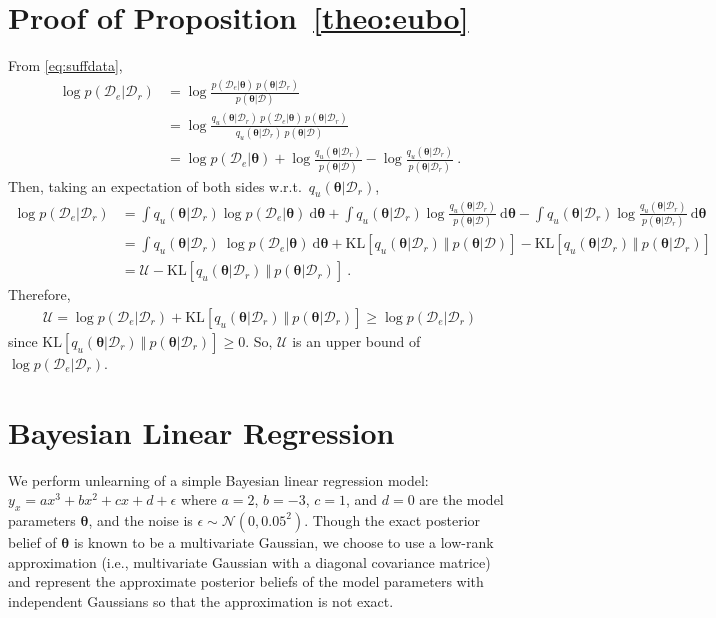 \documentclass{article}
\theoremstyle{definition}
\newcommand{\mcl}[1]{\mathcal{#1}}
\newcommand{\da}{\mcl{D}}
\newcommand{\dc}{\mcl{D}_r}
\newcommand{\dr}{\mcl{D}_e}
\begin{document}
\section{Proof of Proposition~\ref{theo:eubo}}
\label{app:eubo}
%
From \eqref{eq:suffdata}, 
%
\begin{align*}
\log p(\dr|\dc) &= \log \frac{p(\dr|\bm{\theta})\ p(\bm{\theta}|\dc)}{p(\bm{\theta}|\da)}\\
    &= \log \frac{q_u(\bm{\theta}|\dc)\ p(\dr|\bm{\theta})\  p(\bm{\theta}|\dc)}{q_u(\bm{\theta}|\dc)\  p(\bm{\theta}|\da)}\\
    &= \log p(\dr|\bm{\theta})
    + \log \frac{q_u(\bm{\theta}|\dc)}{p(\bm{\theta}|\da)}
    - \log \frac{q_u(\bm{\theta}|\dc)}{p(\bm{\theta}|\dc)}\ .
\end{align*}
%
Then, taking an expectation of both sides w.r.t.~$q_u(\bm{\theta}|\dc)$,
%
\begin{align*}
\log p(\dr|\dc) &=
    \int q_u(\bm{\theta}|\dc) \log p(\dr|\bm{\theta})\ \text{d}\bm{\theta}
    + \int q_u(\bm{\theta}|\dc) \log \frac{q_u(\bm{\theta}|\dc)}{p(\bm{\theta}|\da)}\ \text{d}\bm{\theta}
    - \int q_u(\bm{\theta}|\dc) \log \frac{q_u(\bm{\theta}|\dc)}{p(\bm{\theta}|\dc)}\ \text{d}\bm{\theta}\\
    &= \int q_u(\bm{\theta}|\dc)\  \log p(\dr|\bm{\theta})\ \text{d}\bm{\theta}
    + \text{KL}[q_u(\bm{\theta}|\dc)\ \Vert\ p(\bm{\theta}|\da)]
    - \text{KL}[q_u(\bm{\theta}|\dc)\ \Vert\ p(\bm{\theta}|\dc)]\\
    &= \mcl{U} - \text{KL}[q_u(\bm{\theta}|\dc)\ \Vert\ p(\bm{\theta}|\dc)]\ .
\end{align*}
%
Therefore,
%
\begin{align*}
\mcl{U} =  \log p(\dr|\dc) + \text{KL}[q_u(\bm{\theta}|\dc)\ \Vert\ p(\bm{\theta}|\dc)] \ge \log p(\dr|\dc)
\end{align*}
%
since $\text{KL}[q_u(\bm{\theta}|\dc)\ \Vert\ p(\bm{\theta}|\dc)] \ge 0$.
So, $\mcl{U}$ is an upper bound of $\log p(\dr|\dc)$.
%
\section{Bayesian Linear Regression}
\label{app:lr}
%
We perform unlearning of a simple Bayesian linear regression model: $y_x = ax^3 + bx^2 + cx + d + \epsilon$ where $a=2$, $b=-3$, $c=1$, and $d=0$ are the model parameters $\bm{\theta}$, and the noise is $\epsilon \sim \mcl{N}(0,0.05^2)$. 
Though the exact posterior belief of $\bm{\theta}$ is known to be a multivariate Gaussian, we choose to use a low-rank approximation (i.e.,  multivariate Gaussian with a diagonal covariance matrice) and represent the approximate posterior beliefs of the model parameters with independent Gaussians 
so that the approximation is not exact.
\end{document}
